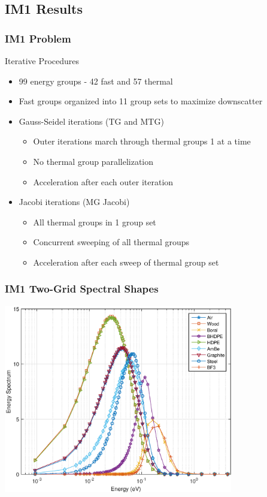\documentclass[compress,10pt]{beamer}
\begin{document}
\subsection{IM1 Results}
\begin{frame}[t]\frametitle{IM1 Problem}
\begin{block}{Iterative Procedures}
\begin{itemize}
	\item 99 energy groups - 42 fast and 57 thermal
	\item Fast groups organized into 11 group sets to maximize downscatter
	\item Gauss-Seidel iterations (TG and MTG)
	\begin{itemize}
		\item Outer iterations march through thermal groups 1 at a time
		\item No thermal group parallelization
		\item Acceleration after each outer iteration
	\end{itemize}
	\item Jacobi iterations (MG Jacobi)
	\begin{itemize}
		\item All thermal groups in 1 group set
		\item Concurrent sweeping of all thermal groups
		\item Acceleration after each sweep of thermal group set
	\end{itemize}
\end{itemize}
\end{block}
\end{frame}
\begin{frame}[t]
\frametitle{IM1 Two-Grid Spectral Shapes}
\hspace*{1.1cm}
\includegraphics[width=0.75\textwidth]{images/IM1_EC_TG.eps}
\end{frame}
\end{document}
